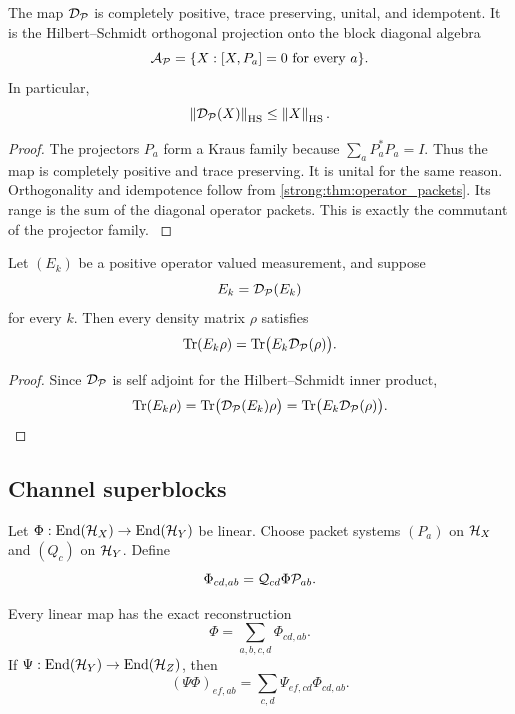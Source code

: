 \begin{theorem}\label{strong:theorem:020}\label{strong:thm:dephasing_expectation}
The map \(\Dcal_{\Pcal}\) is completely positive, trace preserving, unital, and idempotent. It is the Hilbert--Schmidt orthogonal projection onto the block diagonal algebra
\[
\Acal_{\Pcal}
=
\{X:[X,P_a]=0\text{ for every }a\}.
\]
In particular,
\[
\norm{\Dcal_{\Pcal}(X)}_{\HS}
\leq
\norm{X}_{\HS}.
\]
\end{theorem}

\begin{proof}\label{strong:proof:030}
The projectors \(P_a\) form a Kraus family because \(\sum_aP_a^*P_a=I\). Thus the map is completely positive and trace preserving. It is unital for the same reason. Orthogonality and idempotence follow from \cref{strong:thm:operator_packets}. Its range is the sum of the diagonal operator packets. This is exactly the commutant of the projector family.
\label{strong:proof:030:end}\end{proof}

\begin{corollary}\label{strong:corollary:008}\label{strong:cor:measurement_invariance}
Let \((E_k)\) be a positive operator valued measurement, and suppose
\[
E_k=\Dcal_{\Pcal}(E_k)
\]
for every \(k\). Then every density matrix \(\rho\) satisfies
\[
\Tr(E_k\rho)
=
\Tr\bigl(E_k\Dcal_{\Pcal}(\rho)\bigr).
\]
\end{corollary}

\begin{proof}\label{strong:proof:031}
Since \(\Dcal_{\Pcal}\) is self adjoint for the Hilbert--Schmidt inner product,
\[
\Tr(E_k\rho)
=
\Tr\bigl(\Dcal_{\Pcal}(E_k)\rho\bigr)
=
\Tr\bigl(E_k\Dcal_{\Pcal}(\rho)\bigr).
\]
\label{strong:proof:031:end}\end{proof}

\subsection{Channel superblocks}\label{strong:subsec:channel_blocks}

Let \(\Phi:\End(\Hcal_X)\to\End(\Hcal_Y)\) be linear. Choose packet systems \((P_a)\) on \(\Hcal_X\) and \((Q_c)\) on \(\Hcal_Y\). Define
\[
\Phi_{cd,ab}
=
\Qcal_{cd}\Phi\Pcal_{ab}.
\]

\begin{theorem}\label{strong:theorem:021}\label{strong:thm:channel_blocks}
Every linear map has the exact reconstruction
\[
\Phi=\sum_{a,b,c,d}\Phi_{cd,ab}.
\]
If \(\Psi:\End(\Hcal_Y)\to\End(\Hcal_Z)\), then
\[
(\Psi\Phi)_{ef,ab}
=
\sum_{c,d}
\Psi_{ef,cd}\Phi_{cd,ab}.
\]
\end{theorem}

